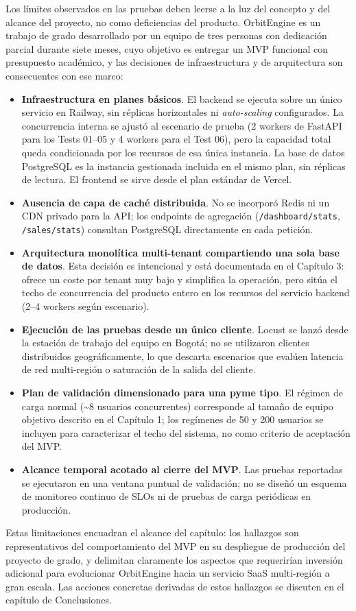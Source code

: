 Los límites observados en las pruebas deben leerse a la luz del concepto y del alcance del proyecto, no como deficiencias del producto. OrbitEngine es un trabajo de grado desarrollado por un equipo de tres personas con dedicación parcial durante siete meses, cuyo objetivo es entregar un MVP funcional con presupuesto académico, y las decisiones de infraestructura y de arquitectura son consecuentes con ese marco:

\begin{itemize}
\tightlist
\item
  \textbf{Infraestructura en planes básicos}. El backend se ejecuta sobre un único servicio en Railway, sin réplicas horizontales ni \emph{auto-scaling} configurados. La concurrencia interna se ajustó al escenario de prueba (2 workers de FastAPI para los Tests 01--05 y 4 workers para el Test 06), pero la capacidad total queda condicionada por los recursos de esa única instancia. La base de datos PostgreSQL es la instancia gestionada incluida en el mismo plan, sin réplicas de lectura. El frontend se sirve desde el plan estándar de Vercel.
\item
  \textbf{Ausencia de capa de caché distribuida}. No se incorporó Redis ni un CDN privado para la API; los endpoints de agregación (\texttt{/dashboard/stats}, \texttt{/sales/stats}) consultan PostgreSQL directamente en cada petición.
\item
  \textbf{Arquitectura monolítica multi-tenant compartiendo una sola base de datos}. Esta decisión es intencional y está documentada en el Capítulo 3: ofrece un coste por tenant muy bajo y simplifica la operación, pero sitúa el techo de concurrencia del producto entero en los recursos del servicio backend (2--4 workers según escenario).
\item
  \textbf{Ejecución de las pruebas desde un único cliente}. Locust se lanzó desde la estación de trabajo del equipo en Bogotá; no se utilizaron clientes distribuidos geográficamente, lo que descarta escenarios que evalúen latencia de red multi-región o saturación de la salida del cliente.
\item
  \textbf{Plan de validación dimensionado para una pyme tipo}. El régimen de carga normal (\textasciitilde8 usuarios concurrentes) corresponde al tamaño de equipo objetivo descrito en el Capítulo 1; los regímenes de 50 y 200 usuarios se incluyen para caracterizar el techo del sistema, no como criterio de aceptación del MVP.
\item
  \textbf{Alcance temporal acotado al cierre del MVP}. Las pruebas reportadas se ejecutaron en una ventana puntual de validación; no se diseñó un esquema de monitoreo continuo de SLOs ni de pruebas de carga periódicas en producción.
\end{itemize}

Estas limitaciones encuadran el alcance del capítulo: los hallazgos son representativos del comportamiento del MVP en su despliegue de producción del proyecto de grado, y delimitan claramente los aspectos que requerirían inversión adicional para evolucionar OrbitEngine hacia un servicio SaaS multi-región a gran escala. Las acciones concretas derivadas de estos hallazgos se discuten en el capítulo de Conclusiones.
